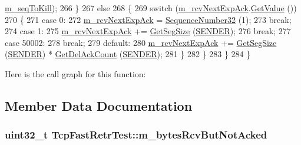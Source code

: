 \begin{DoxyCode}
      \hyperlink{classTcpFastRetrTest_a3064a7c9176cf9822ad2c98fcfab9e7f}{m\_seqToKill});
266         \}
267       \textcolor{keywordflow}{else}
268         \{
269           \textcolor{keywordflow}{switch} (\hyperlink{classTcpFastRetrTest_ab78190a49235a31ec165a895df9ddbaf}{m\_rcvNextExpAck}.\hyperlink{classns3_1_1SequenceNumber_ad1dc215eb95f5371596af8ec914d3e72}{GetValue} ())
270             \{
271             \textcolor{keywordflow}{case} 0:
272               \hyperlink{classTcpFastRetrTest_ab78190a49235a31ec165a895df9ddbaf}{m\_rcvNextExpAck} = \hyperlink{group__network_gacb2070e4e98d2d5135c9bede58f07a03}{SequenceNumber32} (1);
273               \textcolor{keywordflow}{break};
274             \textcolor{keywordflow}{case} 1:
275               \hyperlink{classTcpFastRetrTest_ab78190a49235a31ec165a895df9ddbaf}{m\_rcvNextExpAck} += \hyperlink{classns3_1_1TcpGeneralTest_aa582b6345d877750962fc34012c9e20a}{GetSegSize} (\hyperlink{classns3_1_1TcpGeneralTest_a29338e6b7137cad650c2ff835713f6eea5400e3d6b26928cf9e67ebb026462256}{SENDER});
276               \textcolor{keywordflow}{break};
277             \textcolor{keywordflow}{case} 50002:
278               \textcolor{keywordflow}{break};
279             \textcolor{keywordflow}{default}:
280               \hyperlink{classTcpFastRetrTest_ab78190a49235a31ec165a895df9ddbaf}{m\_rcvNextExpAck} += \hyperlink{classns3_1_1TcpGeneralTest_aa582b6345d877750962fc34012c9e20a}{GetSegSize} (\hyperlink{classns3_1_1TcpGeneralTest_a29338e6b7137cad650c2ff835713f6eea5400e3d6b26928cf9e67ebb026462256}{SENDER}) * 
      \hyperlink{classns3_1_1TcpGeneralTest_a1428f04ca89408a75aa4cdd1cf23acff}{GetDelAckCount} (\hyperlink{classns3_1_1TcpGeneralTest_a29338e6b7137cad650c2ff835713f6eea5400e3d6b26928cf9e67ebb026462256}{SENDER});
281             \}
282         \}
283     \}
284 \}
\end{DoxyCode}


Here is the call graph for this function\+:




\subsection{Member Data Documentation}
\subsubsection[{\texorpdfstring{m\+\_\+bytes\+Rcv\+But\+Not\+Acked}{m_bytesRcvButNotAcked}}]{\setlength{\rightskip}{0pt plus 5cm}uint32\+\_\+t Tcp\+Fast\+Retr\+Test\+::m\+\_\+bytes\+Rcv\+But\+Not\+Acked\hspace{0.3cm}{\ttfamily [protected]}}\hypertarget{classTcpFastRetrTest_acd14a67f45942f32812bb3f81c684fca}{}\label{classTcpFastRetrTest_acd14a67f45942f32812bb3f81c684fca}


